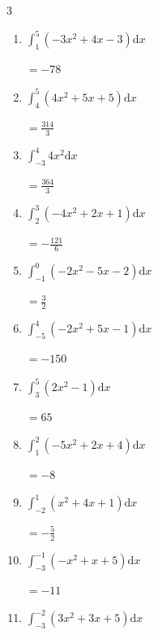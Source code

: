 \begin{multicols}{3}
\begin{enumerate}
        $\displaystyle =-5$

  \item $\displaystyle \int_{1}^{5}\left( -3x^{2}+4x-3 \right) \mathrm{d}x$

        $\displaystyle =-78$

  \item $\displaystyle \int_{4}^{5}\left( 4x^{2}+5x+5 \right) \mathrm{d}x$

        $\displaystyle =\frac{314}{3}$

  \item $\displaystyle \int_{-3}^{4}4x^{2} \mathrm{d}x$

        $\displaystyle =\frac{364}{3}$

\columnbreak %

\resetques

  \item $\displaystyle \int_{2}^{3}\left( -4x^{2}+2x+1 \right) \mathrm{d}x$

        $\displaystyle =-\frac{121}{6}$

  \item $\displaystyle \int_{-1}^{0}\left( -2x^{2}-5x-2 \right) \mathrm{d}x$

        $\displaystyle =\frac{3}{2}$

  \item $\displaystyle \int_{-5}^{4}\left( -2x^{2}+5x-1 \right) \mathrm{d}x$

        $\displaystyle =-150$

  \item $\displaystyle \int_{3}^{5}\left( 2x^{2}-1 \right) \mathrm{d}x$

        $\displaystyle =65$

  \item $\displaystyle \int_{1}^{2}\left( -5x^{2}+2x+4 \right) \mathrm{d}x$

        $\displaystyle =-8$

\columnbreak %

  \item $\displaystyle \int_{-2}^{1}\left( x^{2}+4x+1 \right) \mathrm{d}x$

        $\displaystyle =-\frac{5}{2}$

  \item $\displaystyle \int_{-3}^{-1}\left( -x^{2}+x+5 \right) \mathrm{d}x$

        $\displaystyle =-11$

  \item $\displaystyle \int_{-3}^{-2}\left( 3x^{2}+3x+5 \right) \mathrm{d}x$


\end{enumerate}
\end{multicols}
